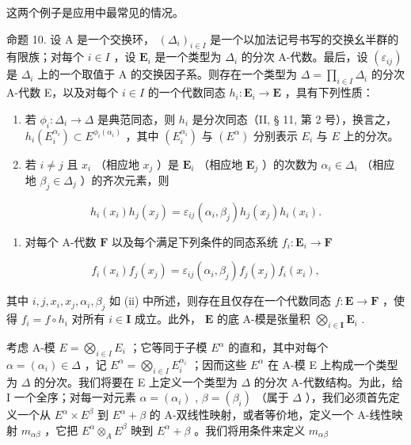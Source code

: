这两个例子是应用中最常见的情况。

命题 10. 设 A 是一个交换环， \((\Delta_{i})_{i\in I}\) 是一个以加法记号书写的交换幺半群的有限族；对每个 \(i\in I\) ，设 \(\mathbf{E}_i\) 是一个类型为 \(\Delta_i\) 的分次 A-代数。最后，设 \((\varepsilon_{ij})\) 是 \(\Delta_i\) 上的一个取值于 A 的交换因子系。则存在一个类型为 \(\Delta = \prod_{i\in I}\Delta_i\) 的分次 A-代数 E，以及对每个 \(i\in I\) 的一个代数同态 \(h_i:\mathbf{E}_i\to \mathbf{E}\) ，具有下列性质：

\begin{enumerate}
\def\labelenumi{(\roman{enumi})}
\item
  若 \(\phi_{i}:\Delta_{i}\to\Delta\) 是典范同态，则 \(h_{i}\) 是分次同态（II, § 11, 第 2 号），换言之， \(h_{i}(E_{i}^{\alpha_{i}})\subset E^{\phi_{i}(\alpha_{i})}\) ，其中 \((E_{i}^{\alpha_{i}})\) 与 \((E^{\alpha})\) 分别表示 \(E_{i}\) 与 \(E\) 上的分次。
\item
  若 \(i \neq j\) 且 \(x_{i}\) （相应地 \(x_{j}\) ）是 \(\mathbf{E}_i\) （相应地 \(\mathbf{E}_j\) ）的次数为 \(\alpha_i \in \Delta_i\) （相应地 \(\beta_j \in \Delta_j\) ）的齐次元素，则
\end{enumerate}

\[
h _ {i} (x _ {i}) h _ {j} (x _ {j}) = \varepsilon_ {i j} (\alpha_ {i}, \beta_ {j}) h _ {j} (x _ {j}) h _ {i} (x _ {i}).\tag{25}
\]

\begin{enumerate}
\def\labelenumi{(\roman{enumi})}
\setcounter{enumi}{2}
\tightlist
\item
  对每个 A-代数 \(\mathbf{F}\) 以及每个满足下列条件的同态系统 \(f_{i}:\mathbf{E}_{i}\to \mathbf{F}\)
\end{enumerate}

\[
f _ {i} (x _ {i}) f _ {j} (x _ {j}) = \varepsilon_ {i j} (\alpha_ {i}, \beta_ {j}) f _ {j} (x _ {j}) f _ {i} (x _ {i}),\tag{26}
\]

其中 \(i, j, x_i, x_j, \alpha_i, \beta_j\) 如 (ii) 中所述，则存在且仅存在一个代数同态 \(f: \mathbf{E} \to \mathbf{F}\) ，使得 \(f_i = f \circ h_i\) 对所有 \(i \in \mathbf{I}\) 成立。此外， \(\mathbf{E}\) 的底 A-模是张量积 \(\bigotimes_{i \in \mathbf{I}} \mathbf{E}_i\) .

考虑 A-模 \(E = \bigotimes_{i \in I} E_i\) ；它等同于子模 \(E^\alpha\) 的直和，其中对每个 \(\alpha = (\alpha_i) \in \Delta\) ，记 \(E^\alpha = \bigotimes_{i \in I} E_i^{\alpha_i}\) ；因而这些 \(E^\alpha\) 在 A-模 E 上构成一个类型为 \(\Delta\) 的分次。我们将要在 E 上定义一个类型为 \(\Delta\) 的分次 A-代数结构。为此，给 I 一个全序；对每一对元素 \(\alpha = (\alpha_i)\) , \(\beta = (\beta_i)\) （属于 \(\Delta\) ），我们必须首先定义一个从 \(E^\alpha \times E^\beta\) 到 \(E^\alpha + \beta\) 的 A-双线性映射，或者等价地，定义一个 A-线性映射 \(m_{\alpha\beta}\) ，它把 \(E^\alpha \otimes_A E^\beta\) 映到 \(E^\alpha + \beta\) 。我们将用条件来定义 \(m_{\alpha\beta}\)


